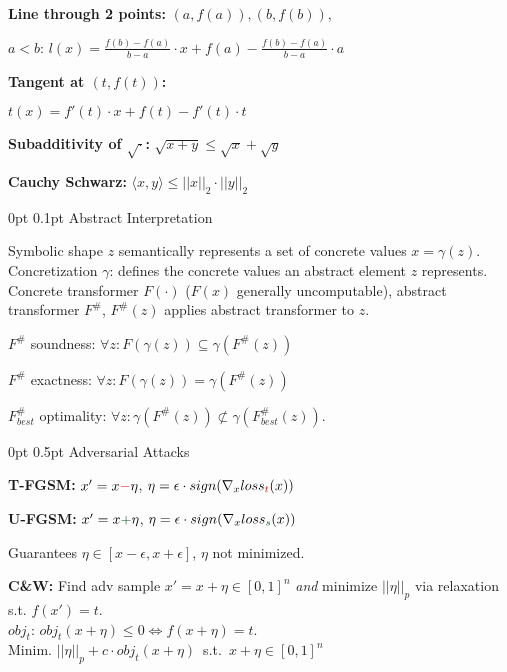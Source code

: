 \documentclass[11pt,landscape,a4paper,fleqn]{article}
\makeatletter
\renewcommand{\section}{\@startsection{section}{1}{0mm}%
                                {0pt}%
                                {0.5pt}%
                                {\color{myorange}\sffamily\small\bfseries}}
\renewcommand{\subsection}{\@startsection{subsection}{1}{0mm}%
                                {0pt}%
                                {0.1pt}%
                            	{\color{myorange2}\sffamily\small}}
\makeatother
\begin{document}
\begin{multicols*}{4}
\textbf{Line through 2 points:} $(a, f(a)), (b, f(b))$,

$a < b$: $l(x) = \frac{f(b) - f(a)}{b - a} \cdot x + f(a) - \frac{f(b) - f(a)}{b - a} \cdot a$

\textbf{Tangent at $(t, f(t))$:}

$t(x) = f'(t) \cdot x + f(t) - f'(t) \cdot t$

\textbf{Subadditivity of $\sqrt{\cdot}$:} $\sqrt{x + y} \leq \sqrt{x} + \sqrt{y}$

\textbf{Cauchy Schwarz:} $\langle x,y \rangle \leq ||x||_2 \cdot ||y||_2$

\subsection{Abstract Interpretation}

Symbolic shape $z$ semantically represents a set of concrete values $x = \gamma(z)$. Concretization $\gamma$: defines the concrete values an abstract element $z$ represents. Concrete transformer $F(\cdot)$ ($F(x)$ generally uncomputable), abstract transformer $F^\#$, $F^\#(z)$ applies abstract transformer to $z$.

$F^\#$ soundness: $\forall z: F(\gamma(z)) \subseteq \gamma(F^\#(z))$

$F^\#$ exactness: $\forall z: F(\gamma(z)) = \gamma(F^\#(z))$

$F_{best}^\#$ optimality: $\forall z: \gamma(F^\#(z)) \not\subset \gamma(F_{best}^\#(z))$.

\section{Adversarial Attacks}
	
\textbf{T-FGSM:} $x' = x \textcolor{red}{-} \eta$, $\eta =\epsilon \cdot sign(\nabla_x loss_{\textcolor{red}{t}} (x))$

\textbf{U-FGSM:} $x' = x \textcolor{darkgreen}{+} \eta$, $\eta = \epsilon \cdot sign(\nabla_x loss_{\textcolor{darkgreen}{s}} (x))$

Guarantees $\eta \in [x-\epsilon, x+\epsilon]$, $\eta$ not minimized.


\textbf{C\&W:} Find adv sample $x' = x + \eta \in [0,1]^n$ \textit{and} minimize $||\eta||_p$ via relaxation s.t. $f(x') = t$.\\
$obj_t$: $obj_t(x+\eta) \leq 0 \Leftrightarrow f(x+\eta) = t$.\\
Minim. \mbox{{$||\eta||_p + c \cdot obj_t(x+\eta)$ s.t. $x+\eta \in [0,1]^n$}}



\end{multicols*}
\end{document}
